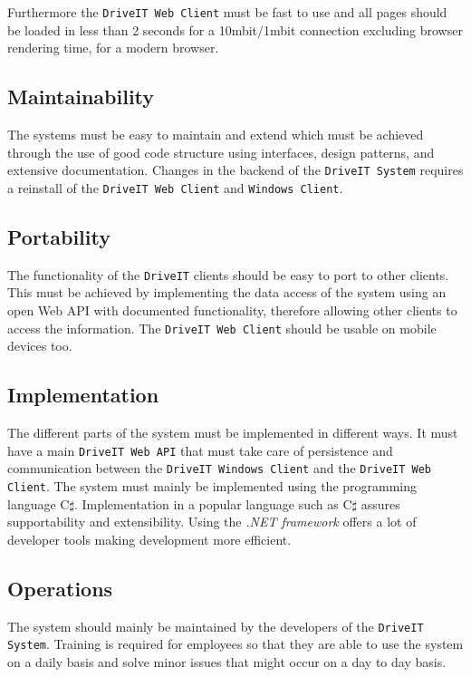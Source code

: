 Furthermore the \texttt{DriveIT Web Client} must be fast to use and all pages should be loaded in less than 2 seconds for a 10mbit/1mbit connection excluding browser rendering time, for a modern browser.

\subsection{Maintainability}
The systems must be easy to maintain and extend which must be achieved through the use of good code structure using interfaces, design patterns, and extensive documentation. Changes in the backend of the \texttt{DriveIT System} requires a reinstall of the \texttt{DriveIT Web Client} and \texttt{Windows Client}.

\subsection{Portability}
The functionality of the \texttt{DriveIT} clients should be easy to port to other clients. This must be achieved by implementing the data access of the system using an open Web API with documented functionality, therefore allowing other clients to access the information. The \texttt{DriveIT Web Client} should be usable on mobile devices too.

\subsection{Implementation}
The different parts of the system must be implemented in different ways. It must have a main \texttt{DriveIT Web API} that must take care of persistence and communication between the \texttt{DriveIT Windows Client} and the \texttt{DriveIT Web Client}. The system must mainly be implemented using the programming language C$\sharp$. Implementation in a popular language such as C$\sharp$ assures supportability and extensibility. 
Using the \textit{.NET framework} offers a lot of developer tools making development more efficient.

\subsection{Operations}
The system should mainly be maintained by the developers of the \texttt{DriveIT System}. Training is required for employees so that they are able to use the system on a daily basis and solve minor issues that might occur on a day to day basis.
